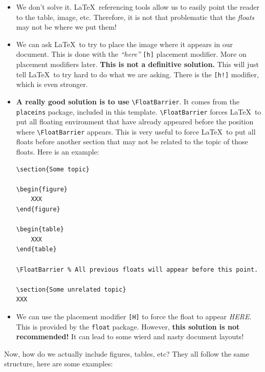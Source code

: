 \begin{itemize}
	\item We don't solve it. \LaTeX\ referencing tools allow us to easily point the reader to the table, image, etc. Therefore, it is not that problematic that the \emph{floats} may not be where we put them!
	\item We can ask \LaTeX\ to try to place the image where it appears in our document. This is done with the \emph{``here''} \verb|[h]| placement modifier. More on placement modifiers later. \textbf{This is not a definitive solution.} This will just tell \LaTeX\ to try hard to do what we are asking. There is the \verb|[h!]| modifier, which is even stronger.
	\item \textbf{A really good solution is to use} \verb|\FloatBarrier|. It comes from the \verb|placeins| package, included in this template. \verb|\FloatBarrier| forces \LaTeX\ to put all floating environment that have already appeared before the position where \verb|\FloatBarrier| appears. This is very useful to force \LaTeX\ to put all floats before another section that may not be related to the topic of those floats. Here is an example:

\begin{lstlisting}[language={[LaTeX]TeX}]
\section{Some topic}

\begin{figure}
	XXX
\end{figure}

\begin{table}
	XXX
\end{table}

\FloatBarrier % All previous floats will appear before this point.

\section{Some unrelated topic}
XXX
\end{lstlisting}
	\item We can use the placement modifier \verb|[H]| to force the float to appear \emph{HERE}. This is provided by the \verb|float| package. However, \textbf{this solution is not recommended!} It can lead to some wierd and nasty document layouts!
\end{itemize}

Now, how do we actually include figures, tables, etc? They all follow the same structure, here are some examples:

